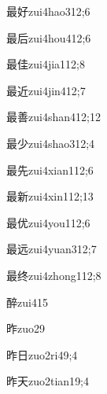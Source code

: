 \begin{verbete}{最好}{zui4hao3}{12;6}
\end{verbete}
\begin{verbete}{最后}{zui4hou4}{12;6}
\end{verbete}
\begin{verbete}{最佳}{zui4jia1}{12;8}
\end{verbete}
\begin{verbete}{最近}{zui4jin4}{12;7}
\end{verbete}
\begin{verbete}{最善}{zui4shan4}{12;12}
\end{verbete}
\begin{verbete}{最少}{zui4shao3}{12;4}
\end{verbete}
\begin{verbete}{最先}{zui4xian1}{12;6}
\end{verbete}
\begin{verbete}{最新}{zui4xin1}{12;13}
\end{verbete}
\begin{verbete}{最优}{zui4you1}{12;6}
\end{verbete}
\begin{verbete}{最远}{zui4yuan3}{12;7}
\end{verbete}
\begin{verbete}{最终}{zui4zhong1}{12;8}
\end{verbete}
\begin{verbete}{醉}{zui4}{15}
\end{verbete}
\begin{verbete}{昨}{zuo2}{9}
\end{verbete}
\begin{verbete}{昨日}{zuo2ri4}{9;4}
\end{verbete}
\begin{verbete}{昨天}{zuo2tian1}{9;4}
\end{verbete}
